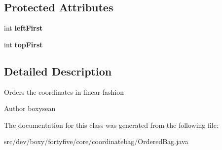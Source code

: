 \subsection*{Protected Attributes}
\begin{DoxyCompactItemize}
\item 
\hypertarget{classdev_1_1boxy_1_1fortyfive_1_1core_1_1coordinatebag_1_1_ordered_bag_ad936793cf1b8de4c4567d51841c3f606}{
int {\bfseries leftFirst}}
\label{d3/de4/classdev_1_1boxy_1_1fortyfive_1_1core_1_1coordinatebag_1_1_ordered_bag_ad936793cf1b8de4c4567d51841c3f606}

\item 
\hypertarget{classdev_1_1boxy_1_1fortyfive_1_1core_1_1coordinatebag_1_1_ordered_bag_a393464d34a5db5010d5b0db4d30c828f}{
int {\bfseries topFirst}}
\label{d3/de4/classdev_1_1boxy_1_1fortyfive_1_1core_1_1coordinatebag_1_1_ordered_bag_a393464d34a5db5010d5b0db4d30c828f}

\end{DoxyCompactItemize}


\subsection{Detailed Description}
Orders the coordinates in linear fashion \begin{DoxyAuthor}{Author}
boxysean 
\end{DoxyAuthor}


The documentation for this class was generated from the following file:\begin{DoxyCompactItemize}
\item 
src/dev/boxy/fortyfive/core/coordinatebag/OrderedBag.java\end{DoxyCompactItemize}
